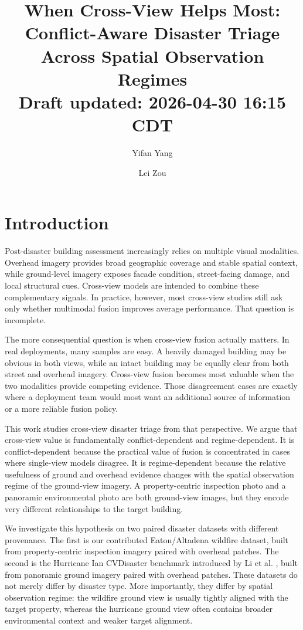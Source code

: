 \documentclass[sigconf]{acmart}
\title{When Cross-View Helps Most: Conflict-Aware Disaster Triage Across Spatial Observation Regimes\\\large\mdseries Draft updated: 2026-04-30 16:15 CDT}
\author{Yifan Yang}
\affiliation{%
  \department{Department of Geography}
  \institution{Texas A\&M University}
  \city{College Station}
  \state{Texas}
  \country{USA}
}
\author{Lei Zou}
\affiliation{%
  \department{Department of Geography}
  \institution{Texas A\&M University}
  \city{College Station}
  \state{Texas}
  \country{USA}
}
\begin{document}
\maketitle

\section{Introduction}

Post-disaster building assessment increasingly relies on multiple visual
modalities. Overhead imagery provides broad geographic coverage and stable
spatial context, while ground-level imagery exposes facade condition,
street-facing damage, and local structural cues. Cross-view models are intended
to combine these complementary signals. In practice, however, most cross-view
studies still ask only whether multimodal fusion improves average performance.
That question is incomplete.

The more consequential question is when cross-view fusion actually matters. In
real deployments, many samples are easy. A heavily damaged building may be
obvious in both views, while an intact building may be equally clear from both
street and overhead imagery. Cross-view fusion becomes most valuable when the
two modalities provide competing evidence. Those disagreement cases are exactly
where a deployment team would most want an additional source of information or
a more reliable fusion policy.

This work studies cross-view disaster triage from that perspective. We argue
that cross-view value is fundamentally conflict-dependent and regime-dependent.
It is conflict-dependent because the practical value of fusion is concentrated
in cases where single-view models disagree. It is regime-dependent because the
relative usefulness of ground and overhead evidence changes with the spatial
observation regime of the ground-view imagery. A property-centric inspection
photo and a panoramic environmental photo are both ground-view images, but they
encode very different relationships to the target building.

We investigate this hypothesis on two paired disaster datasets with different
provenance. The first is our contributed Eaton/Altadena wildfire dataset, built
from property-centric inspection imagery paired with overhead patches. The
second is the Hurricane Ian CVDisaster benchmark introduced by Li et al.
\cite{li2025cross}, built from panoramic ground imagery paired with overhead
patches. These datasets do not merely differ by disaster type. More
importantly, they differ by spatial observation regime: the wildfire ground
view is usually tightly aligned with the target property, whereas the hurricane
ground view often contains broader environmental context and weaker target
alignment.
\end{document}
